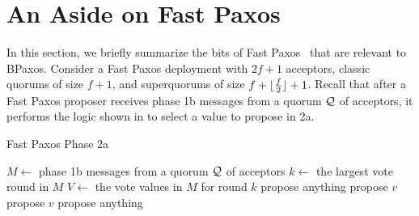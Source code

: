 \section{An Aside on Fast Paxos}
In this section, we briefly summarize the bits of Fast
Paxos~\cite{lamport2006fast} that are relevant to BPaxos.
%
Consider a Fast Paxos deployment with $2f + 1$ acceptors, classic quorums of
size $f + 1$, and superquorums of size $f + \lfloor\frac{f}{2}\rfloor + 1$. Recall that
after a Fast Paxos proposer receives phase 1b messages from a quorum $\mathcal{Q}$
of acceptors, it performs the logic shown in  to select a
value to propose in 2a.

\begin{algorithm}[ht]
  \caption{Fast Paxos Phase 2a}%
  \begin{algorithmic}[1]
    \State $M \gets$ phase 1b messages from a quorum $\mathcal{Q}$ of acceptors
    \State $k \gets$ the largest vote round in $M$
    \State $V \gets$ the vote values in $M$ for round $k$
      \State propose anything
      \State propose $v$
      \State propose $v$
    \Else{}
      \State propose anything
    \EndIf{}
  \end{algorithmic}
\end{algorithm}

